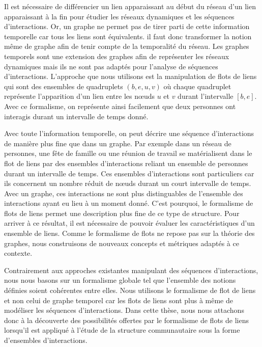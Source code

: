 Il est nécessaire de différencier un lien apparaissant au début du réseau d'un lien apparaissant à la fin pour étudier les réseaux dynamiques et les séquences d'interactions.
Or, un graphe ne permet pas de tirer parti de cette information temporelle car tous les liens sont équivalents. 
il faut donc transformer la notion même de graphe afin de tenir compte de la temporalité du réseau.
Les graphes temporels sont une extension des graphes afin de représenter les réseaux dynamiques mais ils ne sont pas adaptés pour l'analyse de séquences d'interactions.
L'approche que nous utilisons est la manipulation de flots de liens qui sont des ensembles de quadruplets $(b, e, u, v)$ où chaque quadruplet représente l’apparition d’un lien entre les n\oe uds $u$ et $v$ durant l'intervalle $[b,e]$.
Avec ce formalisme, on représente ainsi facilement que deux personnes ont interagis durant un intervalle de temps donné.


Avec toute l'information temporelle, on peut décrire une séquence d'interactions de manière plus fine que dans un graphe.
Par exemple dans un réseau de personnes, une fête de famille ou une réunion de travail se matérialisent dans le flot de liens par des ensembles d'interactions reliant un ensemble de personnes durant un intervalle de temps.
Ces ensembles d'interactions sont particuliers car ils concernent un nombre réduit de n\oe uds durant un court intervalle de temps.
Avec un graphe, ces interactions ne sont plus distinguables de l'ensemble des interactions ayant eu lieu à un moment donné.
C'est pourquoi, le formalisme de flots de liens permet une description plus fine de ce type de structure.
Pour arriver à ce résultat, il est nécessaire de pouvoir évaluer les caractéristiques d'un ensemble de liens.
Comme le formalisme de flots ne repose pas sur la théorie des graphes, nous construisons de nouveaux concepts et métriques adaptés à ce contexte.


\bigskip


Contrairement aux approches existantes manipulant des séquences d'interactions, nous nous basons sur un formalisme globale tel que l'ensemble des notions définies soient cohérentes entre elles.
Nous utilisons le formalisme de flot de liens et non celui de graphe temporel car les flots de liens sont plus à même de modéliser les séquences d'interactions.
Dans cette thèse, nous nous attachons donc à la découverte des possibilités offertes par le formalisme de flots de liens lorsqu'il est appliqué à l'étude de la structure communautaire sous la forme d'ensembles d'interactions.


